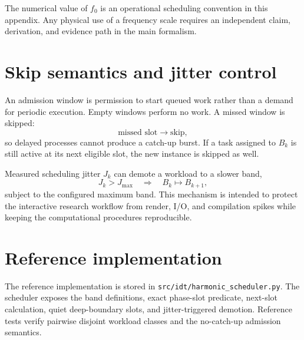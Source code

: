 The numerical value of $f_0$ is an operational scheduling convention in this appendix. Any physical use of a frequency scale requires an independent claim, derivation, and evidence path in the main formalism.

\section{Skip semantics and jitter control}

An admission window is permission to start queued work rather than a demand for periodic execution. Empty windows perform no work. A missed window is skipped:
\[
\text{missed slot}\longrightarrow\text{skip},
\]
so delayed processes cannot produce a catch-up burst. If a task assigned to $B_k$ is still active at its next eligible slot, the new instance is skipped as well.

Measured scheduling jitter $J_k$ can demote a workload to a slower band,
\[
J_k>J_{\max}
\quad\Longrightarrow\quad
B_k\mapsto B_{k+1},
\]
subject to the configured maximum band. This mechanism is intended to protect the interactive research workflow from render, I/O, and compilation spikes while keeping the computational procedures reproducible.

\section{Reference implementation}

The reference implementation is stored in \texttt{src/idt/harmonic\_scheduler.py}. The scheduler exposes the band definitions, exact phase-slot predicate, next-slot calculation, quiet deep-boundary slots, and jitter-triggered demotion. Reference tests verify pairwise disjoint workload classes and the no-catch-up admission semantics.


